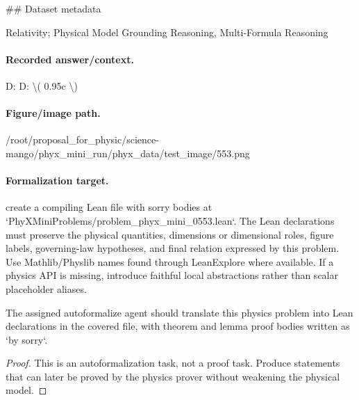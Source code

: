\#\# Dataset metadata

Relativity; Physical Model Grounding Reasoning, Multi-Formula Reasoning

\paragraph{Recorded answer/context.}
D: D: \textbackslash{}( 0.95c \textbackslash{})

\paragraph{Figure/image path.}
/root/proposal\_for\_physic/science-mango/phyx\_mini\_run/phyx\_data/test\_image/553.png

\paragraph{Formalization target.}
create a compiling Lean file with sorry bodies at `PhyXMiniProblems/problem\_phyx\_mini\_0553.lean`. The Lean declarations must preserve the physical quantities, dimensions or dimensional roles, figure labels, governing-law hypotheses, and final relation expressed by this problem.
Use Mathlib/Physlib names found through LeanExplore where available. If a physics API is missing, introduce faithful local abstractions rather than scalar placeholder aliases.

\begin{theorem}
\label{thm:physics:phyx_mini_0553:target}
The assigned autoformalize agent should translate this physics problem into Lean declarations in the covered file, with theorem and lemma proof bodies written as `by sorry`.
\end{theorem}
\begin{proof}
This is an autoformalization task, not a proof task. Produce statements that can later be proved by the physics prover without weakening the physical model.
\end{proof}

